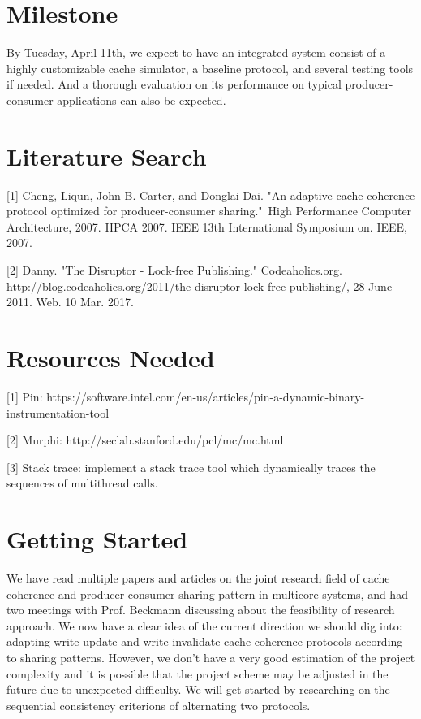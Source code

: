 \documentclass{article} %
\begin{document}
\section{Milestone}

By Tuesday, April 11th, we expect to have an integrated system consist of a highly customizable cache simulator, a baseline protocol, and several testing tools if needed. And a thorough evaluation on its performance on typical producer-consumer applications can also be expected.


\section{Literature Search}

\small{
[1] Cheng, Liqun, John B. Carter, and Donglai Dai. "An adaptive cache coherence protocol optimized for producer-consumer sharing." High Performance Computer Architecture, 2007. HPCA 2007. IEEE 13th International Symposium on. IEEE, 2007.

[2] Danny. "The Disruptor - Lock-free Publishing." Codeaholics.org. http://blog.codeaholics.org/2011/the-disruptor-lock-free-publishing/, 28 June 2011. Web. 10 Mar. 2017.
}


\section{Resources Needed}

\small{
[1] Pin: https://software.intel.com/en-us/articles/pin-a-dynamic-binary-instrumentation-tool

[2] Murphi: http://seclab.stanford.edu/pcl/mc/mc.html

[3] Stack trace: implement a stack trace tool which dynamically traces the sequences of multithread calls.
}


\section{Getting Started}

We have read multiple papers and articles on the joint research field of cache coherence and producer-consumer sharing pattern in multicore systems, and had two meetings with Prof. Beckmann discussing about the feasibility of research approach. We now have a clear idea of the current direction we should dig into: adapting write-update and write-invalidate cache coherence protocols according to sharing patterns. However, we don’t have a very good estimation of the project complexity and it is possible that the project scheme may be adjusted in the future due to unexpected difficulty. We will get started by researching on the sequential consistency criterions of alternating two protocols.
\end{document}
